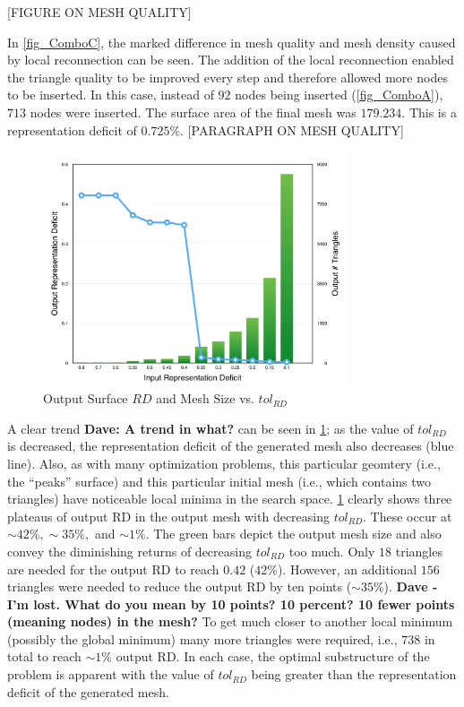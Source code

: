 [FIGURE ON MESH QUALITY]

In \ref{fig_ComboC}, the marked difference in mesh quality and mesh
density caused by local reconnection can be seen.  The addition of the
local reconnection enabled the triangle quality to be improved every
step and therefore allowed more nodes to be inserted. In this case, 
instead of $92$ nodes being inserted (\ref{fig_ComboA}), $713$ nodes were
inserted. The surface area of the final mesh was $179.234$. This is a
representation deficit of $0.725\%$.
[PARAGRAPH ON MESH QUALITY]

\begin{figure}[h!]
  \begin{center}
  \includegraphics[width=90mm]{Figures/RDvsMeshSize.png}
  \caption{Output Surface $RD$ and Mesh Size vs. $tol_{RD}$}
  \label{fig_RDvsMeshSize}
  \end{center}
\end{figure}

A clear trend {\bf{Dave: A trend in what?}} can be seen in 
\ref{fig_RDvsMeshSize}; as the value of
$tol_{RD}$ is decreased, the representation deficit of the generated mesh
also decreases (blue line). Also, as with many optimization problems,
this particular geomtery (i.e., the ``peaks'' surface) and this particular 
initial mesh (i.e., which contains two triangles) have noticeable local 
minima in the search space.
\ref{fig_RDvsMeshSize} clearly shows three plateaus of output
RD in the output mesh with decreasing $tol_{RD}$.  These occur at
$\sim42\%, \sim35\%,$ and $\sim1\%$.  The green bars depict the output
mesh size and also convey the diminishing returns of decreasing
$tol_{RD}$ too much. Only $18$ triangles are needed for the output RD to
reach $0.42$ ($42\%$).  However, an additional $156$ triangles were
needed to reduce the output RD by ten points ($\sim 35\%$). {\bf{Dave - 
I'm lost. What do you mean by 10 points?  10 percent?  10 fewer points 
(meaning nodes) in the mesh?}}  To get much closer to another local 
minimum (possibly the global minimum) many
more triangles were required, i.e., $738$ in total to reach $\sim 1\%$ 
output RD. In each case, the optimal substructure of the problem is 
apparent with the value of $tol_{RD}$ being greater than the 
representation deficit of the generated mesh.
